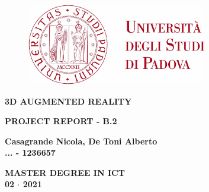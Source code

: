 
\begin{titlepage}
   \begin{center}
   \begin{doublespacing}

       \begin{figure}
       \centering
       \includegraphics[width=0.7\textwidth]{images/Unipd_logo.pdf}
       \end{figure}
       
       
       \vspace*{5mm}
       {\large\textbf{3D AUGMENTED REALITY}}

       \vspace{30mm}
       
       {\Large\textbf{PROJECT REPORT - B.2}}

    
            
       \vspace{30mm}

       {\Large\textbf{Casagrande Nicola, De Toni Alberto}\\
       \textbf{... - 1236657}}

       \vfill
       {\large \textbf{MASTER DEGREE IN ICT}\\
       \textbf{02 $\cdot$ 2021}}
       
    \end{doublespacing}

   \end{center}
\end{titlepage}
